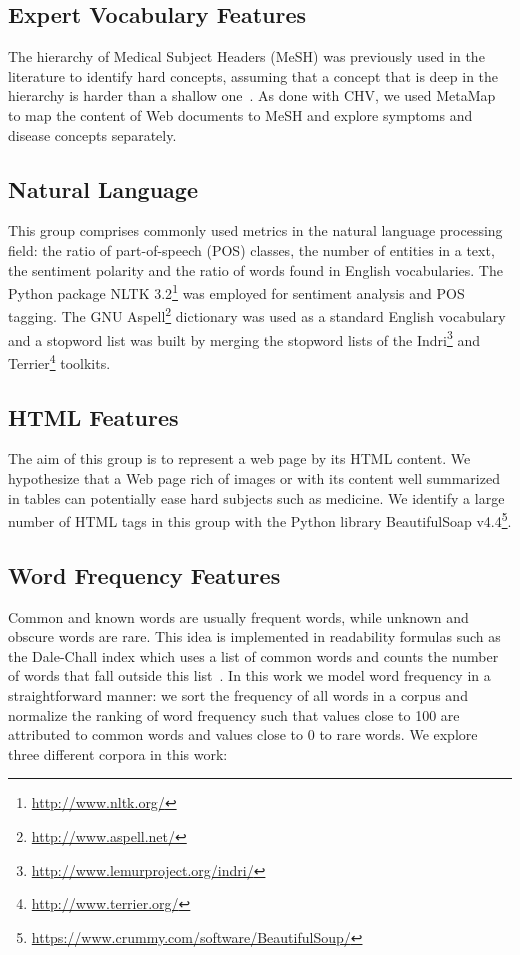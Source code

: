 \documentclass[runningheads,a4paper]{llncs}
\begin{document}
\subsection{Expert Vocabulary Features}

The hierarchy of Medical Subject Headers (MeSH) was previously used in the literature to identify hard concepts, assuming that a concept that is deep in the hierarchy is harder than a shallow one~\cite{yan11}.
As done with CHV, we used MetaMap to map the content of Web documents to MeSH and explore symptoms and disease concepts separately.

\subsection{Natural Language}
This group comprises commonly used metrics in the natural language processing field: the ratio of part-of-speech (POS) classes, the number of entities in a text, the sentiment polarity and the ratio of words found in English vocabularies. The Python package NLTK 3.2\footnote{\url{http://www.nltk.org/}} was employed for sentiment analysis and POS tagging. The GNU Aspell\footnote{\url{http://www.aspell.net/}} dictionary was used as a standard English vocabulary and a stopword list was built by merging the stopword
lists of the Indri\footnote{\url{http://www.lemurproject.org/indri/}} and Terrier\footnote{\url{http://www.terrier.org/}} toolkits. 

\subsection{HTML Features}
The aim of this group is to represent a web page by its HTML content.
We hypothesize that a Web page rich of images or with its content well summarized in tables can potentially ease hard subjects such as medicine. 
We identify a large number of HTML tags in this group with the Python library BeautifulSoap v4.4\footnote{\url{https://www.crummy.com/software/BeautifulSoup/}}.

\subsection{Word Frequency Features}
\label{sec:word_freq}

Common and known words are usually frequent words, while unknown and obscure words are rare. This idea is implemented in readability formulas such as the Dale-Chall index which uses a list of common words and counts the number of words that fall outside this list~\cite{dale48}.
In this work we model word frequency in a straightforward manner: we sort the frequency of all words in a corpus and normalize the ranking of word frequency such that values close to 100 are attributed to common words and values close to 0 to rare words. 
We explore three different corpora in this work:
\end{document}

